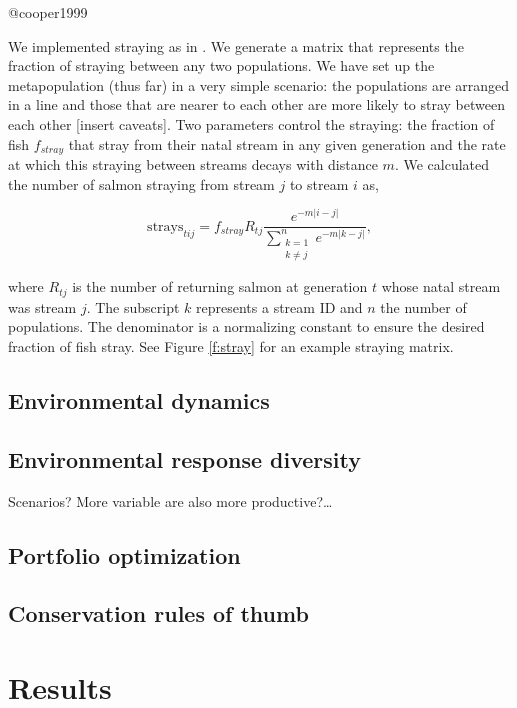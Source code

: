 @cooper1999

We implemented straying as in \citet{Cooper1999}. We generate a matrix
that represents the fraction of straying between any two populations. We
have set up the metapopulation (thus far) in a very simple scenario: the
populations are arranged in a line and those that are nearer to each
other are more likely to stray between each other {[}insert caveats{]}.
Two parameters control the straying: the fraction of fish $f_{stray}$
that stray from their natal stream in any given generation and the rate
at which this straying between streams decays with distance $m$. We
calculated the number of salmon straying from stream $j$ to stream $i$
as,

\begin{equation}
  \mathrm{strays}_{tij} = f_{stray} R_{tj}
    \frac{e^{-m \lvert i-j \rvert }}
      {\displaystyle\sum\limits_{\substack{k = 1 \\
    k \neq j}}^{n} e^{-m \lvert k-j \rvert }},
  \label{eq:stray}
\end{equation}

\noindent
where $R_{tj}$ is the number of returning salmon at generation $t$ whose
natal stream was stream $j$. The subscript $k$ represents a stream ID
and $n$ the number of populations. The denominator is a normalizing
constant to ensure the desired fraction of fish stray. See Figure
\ref{f:stray} for an example straying matrix.

\subsection{Environmental dynamics}

\subsection{Environmental response diversity}

Scenarios? More variable are also more productive?\ldots{}

\subsection{Portfolio optimization}

\subsection{Conservation rules of thumb}

\section{Results}

